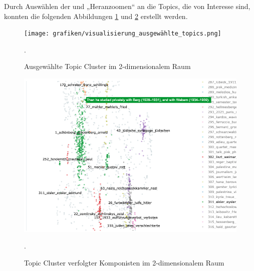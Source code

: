 \documentclass[ngerman]{ttlab-qualify}
\begin{document}
\noindent Durch Auswählen der und „Heranzoomen“ an die Topics, die von Interesse sind, konnten die folgenden Abbildungen \ref{ausgewählte_topics} und \ref{cluster_verfolgt} erstellt werden.
\begin{figure}[H]
\begin{center}
\texttt{[image: grafiken/visualisierung\_ausgewählte\_topics.png]}
\caption[Ausgewählte Topic Cluster im 2-dimensionalem Raum]{Ausgewählte Topic Cluster im 2-dimensionalem Raum}.
\label{ausgewählte_topics}
\end{center}
\end{figure} 
\begin{figure}[H]
\begin{center}
\includegraphics[width=16cm]{grafiken/verfolgte_komponisten_herangezoomt.png}
\caption[Topic Cluster verfolgter Komponisten im 2-dimensionalem Raum]{Topic Cluster verfolgter Komponisten im 2-dimensionalem Raum}.
\label{cluster_verfolgt}
\end{center}
\end{figure} 
\end{document}
